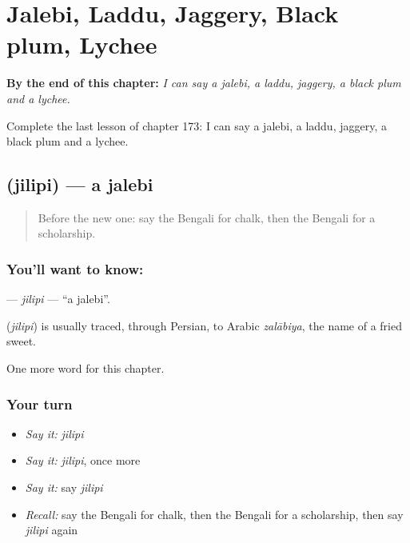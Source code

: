 
\chapter{Jalebi, Laddu, Jaggery, Black plum, Lychee}
\label{ch:bn-jalebi-laddu-jaggery-black-plum-lychee}

\begin{chapteropening}
\textbf{By the end of this chapter:} \emph{I can say a jalebi, a laddu, jaggery, a black plum and a lychee.}

Complete the last lesson of chapter 173: I can say a jalebi, a laddu, jaggery, a black plum and a lychee.
\end{chapteropening}

\section[\texorpdfstring{\bn{জিলিপি} (jilipi)}{জিলিপি (jilipi)}]{ (jilipi) — a jalebi}

\label{lesson:BN-C173-jilipi}



\begin{quote}
Before the new one: say the Bengali for chalk, then the Bengali for a scholarship.
\end{quote}

\subsection*{You'll want to know: }
\textbf{} — \emph{jilipi} — \textquotedblleft{}a jalebi\textquotedblright{}.

\begin{cousinweb}
\textbf{} (\emph{jilipi}) is usually traced, through Persian, to Arabic \emph{zalābiya}, the name of a fried sweet.
\end{cousinweb}

\begin{grammarlens}[title={What you've built}]
One more word for this chapter.
\end{grammarlens}

\subsection*{Your turn}
\begin{itemize}
\raggedright
  \item \emph{Say it:} \emph{jilipi}
  \item \emph{Say it:} \emph{jilipi}, once more
  \item \emph{Say it:} say \emph{jilipi}
  \item \emph{Recall:} say the Bengali for chalk, then the Bengali for a scholarship, then say \emph{jilipi} again
\end{itemize}

